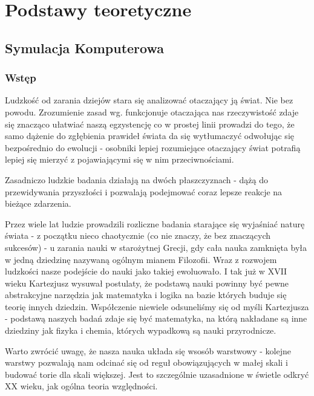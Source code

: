 \chapter{Podstawy teoretyczne}
\section[Symulacja komputerowa][Symulacja komputerowa]{Symulacja Komputerowa}

\subsection{Wstęp}
\par{
Ludzkość od zarania dziejów stara się analizować otaczający ją świat. Nie bez powodu. Zrozumienie zasad wg. funkcjonuje otaczająca nas rzeczywistość zdaje się znacząco ułatwiać naszą egzystencję co w prostej linii prowadzi do tego, że samo dążenie do zgłębienia prawideł świata da się wytłumaczyć odwołując się bezpośrednio do ewolucji - osobniki lepiej rozumiejące otaczający świat potrafią lepiej się mierzyć z pojawiającymi się w nim przeciwnościami.
}

\par{
Zasadniczo ludzkie badania działają na dwóch płaszczyznach - dążą do przewidywania przyszłości i pozwalają podejmować coraz lepsze reakcje na bieżące zdarzenia.
}

\par{
Przez wiele lat ludzie prowadzili rozliczne badania starające się wyjaśniać naturę świata - z początku nieco chaotycznie (co nie znaczy, że bez znaczących sukcesów) - u zarania nauki w starożytnej Grecji, gdy cała nauka zamknięta była w jedną dziedzinę nazywaną ogólnym mianem Filozofii.
Wraz z rozwojem ludzkości nasze podejście do nauki jako takiej ewoluowało. I tak już w XVII wieku Kartezjusz wysuwał postulaty, że podstawą nauki powinny być pewne abstrakcyjne narzędzia jak matematyka i logika na bazie których buduje się teorię innych dziedzin. Współczenie niewiele odsuneliśmy się od myśli Kartezjusza - podstawą naszych badań zdaje się być matematyka, na którą nakładane są inne dziedziny jak fizyka i chemia, których wypadkową są nauki przyrodnicze.
}

\par{
Warto zwrócić uwagę, że nasza nauka układa się wsosób warstwowy - kolejne warstwy pozwalają nam odcinać się od reguł obowiązujących w małej skali i budować torie dla skali większej. Jest to szczególnie uzasadnione w świetle odkryć XX wieku, jak ogólna teoria względności.
}

